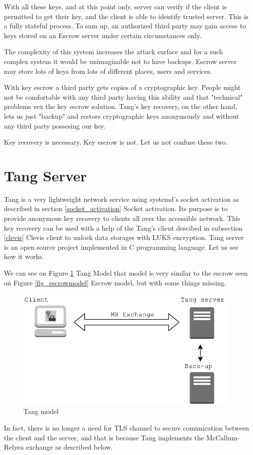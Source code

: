 With all these keys, and at this point only, server can verify if the client is permitted to get their key, and the client is able to identify trusted server.
This is a fully stateful process.
To sum up, an authorized third party may gain access to keys stored on an Escrow server under certain circumstances only.

The complexity of this system increases the attack surface and for a such complex system it would be unimaginable not to have backups.
Escrow server may store lots of keys from lots of different places, users and services.

With key escrow a third party gets copies of a cryptographic key.
People might not be comfortable with any third party having this ability and that "technical" problems vex the key escrow solution.
Tang's key recovery, on the other hand, lets us just "backup" and restore cryptographic keys anonymously and without any third party possesing our key.

Key recovery is necessary.
Key escrow is not.
Let us not confuse these two.



\section{Tang Server}\label{tang}

Tang is a very lightweight network service using systemd's socket activation as described in section \ref{socket_activation} Socket activation.
Its purpose is to provide anonymous key recovery to clients all over the accessible network.
This key recovery can be used with a help of the Tang's client descibed in subsection \ref{clevis} Clevis client to unlock data storages with LUKS encryption.
Tang server is an open source project implemented in C programming language.
Let us see how it works.

We can see on Figure \ref{fig_tangmodel} Tang Model that model is very similar to the escrow seen on Figure \ref{fig_escrowmodel} Escrow model, but with some things missing.
\begin{figure}[h]
    \centering
    \includegraphics[scale=0.7]{figures/TangModel.pdf}
    \caption{Tang model}
    \label{fig_tangmodel}
\end{figure}
In fact, there is no longer a need for TLS channel to secure comunication between the client and the server,
 and that is because Tang implements the McCallum-Relyea exchange as described below.

